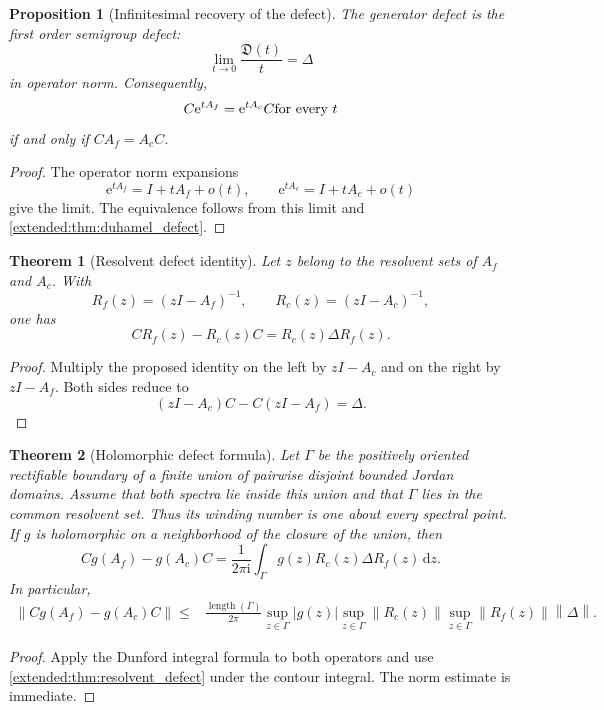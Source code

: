 \documentclass[11pt,letterpaper]{article}
\newtheorem{theorem}{Theorem}[section]
\theoremstyle{plain}
\newtheorem{proposition}[proposition]{Proposition}
\theoremstyle{plain}
\theoremstyle{plain}
\theoremstyle{definition}
\theoremstyle{definition}
\theoremstyle{definition}
\theoremstyle{definition}
\theoremstyle{definition}
\theoremstyle{remark}
\theoremstyle{remark}
\theoremstyle{remark}
\theoremstyle{remark}
\theoremstyle{remark}
\newcommand{\norm}[1]{\left\lVert#1\right\rVert}
\theoremstyle{remark}
\newcommand{\e}{\mathrm e}
\newcommand{\ii}{\mathrm i}
\newcommand{\dd}{\,\mathrm d}
\newcommand{\abs}[1]{\left\lvert#1\right\rvert}
\let\KomorebiPrimitivemathfrak\mathfrak
\renewcommand{\mathfrak}[1]{{\KomorebiPrimitivemathfrak{#1}}}
\let\KomorebiPrimitivemathrm\mathrm
\renewcommand{\mathrm}[1]{{\KomorebiPrimitivemathrm{#1}}}
\begin{document}
\begin{proposition}[Infinitesimal recovery of the defect]\label{extended:record:011}\label{extended:prop:infinitesimal_defect}
The generator defect is the first order semigroup defect:
\[
\lim_{t\to0}
\frac{\mathfrak D(t)}{t}
=
\Delta
\]
in operator norm. Consequently,
\[
C\e^{tA_f}=\e^{tA_c}C
\quad\hbox{for every }t
\]
if and only if \(CA_f=A_cC\).
\end{proposition}

\begin{proof}
The operator norm expansions
\[
\e^{tA_f}=I+tA_f+o(t),
\qquad
\e^{tA_c}=I+tA_c+o(t)
\]
give the limit. The equivalence follows from this limit and \cref{extended:thm:duhamel_defect}.
\end{proof}

\begin{theorem}[Resolvent defect identity]\label{extended:record:012}\label{extended:thm:resolvent_defect}
Let \(z\) belong to the resolvent sets of \(A_f\) and \(A_c\). With
\[
R_f(z)=(zI-A_f)^{-1},
\qquad
R_c(z)=(zI-A_c)^{-1},
\]
one has
\[
CR_f(z)-R_c(z)C
=
R_c(z)\Delta R_f(z).
\]
\end{theorem}

\begin{proof}
Multiply the proposed identity on the left by \(zI-A_c\) and on the right by \(zI-A_f\). Both sides reduce to
\[
(zI-A_c)C-C(zI-A_f)=\Delta.
\]
\end{proof}

\begin{theorem}[Holomorphic defect formula]\label{extended:record:013}\label{extended:thm:holomorphic_defect}
Let \(\Gamma\) be the positively oriented rectifiable boundary of a finite union of pairwise disjoint bounded Jordan domains. Assume that both spectra lie inside this union and that \(\Gamma\) lies in the common resolvent set. Thus its winding number is one about every spectral point. If \(g\) is holomorphic on a neighborhood of the closure of the union, then
\[
Cg(A_f)-g(A_c)C
=
\frac{1}{2\pi\ii}
\int_\Gamma
 g(z)R_c(z)\Delta R_f(z)
\dd z.
\]
In particular,
\[
\begin{aligned}
\norm{Cg(A_f)-g(A_c)C}
\leq{}&
\frac{\operatorname{length}(\Gamma)}{2\pi}
\sup_{z\in\Gamma}\abs{g(z)}
\sup_{z\in\Gamma}\norm{R_c(z)}
\sup_{z\in\Gamma}\norm{R_f(z)}
\norm\Delta.
\end{aligned}
\]
\end{theorem}

\begin{proof}
Apply the Dunford integral formula to both operators and use \cref{extended:thm:resolvent_defect} under the contour integral. The norm estimate is immediate.
\end{proof}
\end{document}
